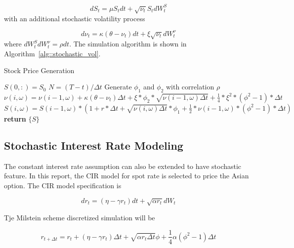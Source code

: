 \documentclass[a4paper,11pt] {article}
\begin{document}
$$
dS_t = \mu S_t dt + \sqrt{\nu_t} S_t d W_t^S
$$
with an additional stochastic volatility process

$$
d\nu_t = \kappa(\theta - \nu_t) dt + \xi \sqrt{\nu_t} d W_t^\nu
$$
where $d W_t^S d W_t^\nu = \rho dt$. The simulation algorithm is shown in Algorithm~\ref{alg::stochastic_vol}.

\begin{algorithm}
\caption{Stock Price Generation}\label{alg::stochastic_vol}
\begin{algorithmic}[1]
\State $S(0,:) = S_0$
\State $N = (T-t)/\Delta t$ 
    
\State Generate $\phi_1$ and $\phi_2$ with correlation $\rho$
\State $\nu(i,\omega)= \nu(i-1,\omega)  + \kappa(\theta - \nu_t) \Delta t + \xi * \phi_2 * \sqrt{\nu(i-1,\omega) \Delta t} + \frac{1}{4} * \xi^2 *(\phi^2-1)*\Delta t$
\State $S(i,\omega)= S(i-1,\omega) * (1 + r * \Delta t + \sqrt{\nu(i,\omega) \Delta t} * \phi_1 + \frac{1}{2} * \nu(i-1,\omega) *(\phi^2-1)*\Delta t)$
\EndFor
\EndFor %
\State \textbf{return} $\{S\}$  %
\EndProcedure
\end{algorithmic}
\end{algorithm}

\subsection{Stochastic Interest Rate Modeling}
The constant interest rate assumption can also be extended to have stochastic feature. In this report, the CIR model for spot rate is selected to price the Asian option. The CIR model specification is

$$
dr_t = (\eta-\gamma r_t) dt + \sqrt{\alpha r_t} d W_t
$$

Tje Milstein scheme discretized simulation will be

$$
r_{t+\Delta t} = r_t + (\eta-\gamma r_t) \Delta t + \sqrt{\alpha r_t \Delta t} \phi + \frac{1}{4} \alpha (\phi^2-1) \Delta t
$$
\end{document}
